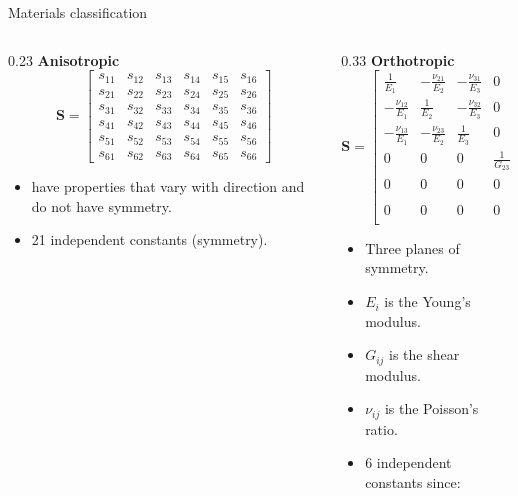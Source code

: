 \documentclass[aspectratio=169]{beamer}
\begin{document}
{\begin{frame}{Materials classification}
  \setlength{\arraycolsep}{2pt}
  \begin{columns}[t]
    \begin{column}{0.23\textwidth}
      \textbf{Anisotropic}
      \tiny $$\mathbf S=\begin{bmatrix} s_{11} & s_{12} & s_{13} & s_{14} & s_{15} & s_{16} \\ s_{21} & s_{22} & s_{23} & s_{24} & s_{25} & s_{26} \\ s_{31} & s_{32} & s_{33} & s_{34} & s_{35} & s_{36} \\ s_{41} & s_{42} & s_{43} & s_{44} & s_{45} & s_{46}\\ s_{51} & s_{52} & s_{53} & s_{54} & s_{55} & s_{56}\\ s_{61} & s_{62} & s_{63} & s_{64} & s_{65} & s_{66} \end{bmatrix}$$
      \begin{itemize}
        \item   have properties that vary with direction and do not have symmetry.
        \item 21 independent constants (symmetry).
      \end{itemize}
    \end{column}
    \begin{column}{0.33\textwidth}
      \textbf{Orthotropic}
      \tiny $$\mathbf S=\begin{bmatrix} \frac{1}{E_1} & -\frac{\nu_{21}}{E_2} & -\frac{\nu_{31}}{E_3} & 0 & 0 & 0 \\  -\frac{\nu_{12}}{E_1} & \frac{1}{E_2}  & -\frac{\nu_{32}}{E_3}  & 0 & 0 & 0 \\ -\frac{\nu_{13}}{E_1} & -\frac{\nu_{23}}{E_2} & \frac{1}{E_3} & 0 & 0 & 0 \\ 0 & 0 & 0 & \frac{1}{G_{23}} & 0 & 0 \\ 0 & 0 & 0 & 0 & \frac{1}{G_{31}} & 0 \\ 0 & 0 & 0 & 0 & 0 & \frac{1}{G_{12}} \end{bmatrix}$$
      \begin{itemize}
        \item Three planes of symmetry.
        \item $E_{i}$ is the Young's modulus.
        \item $G_{ij}$ is the shear modulus.
        \item $\nu_{ij}$ is the Poisson's ratio.
        \item 6 independent constants since:

\end{itemize}
\end{column}
\end{columns}
\end{frame}}
\end{document}

